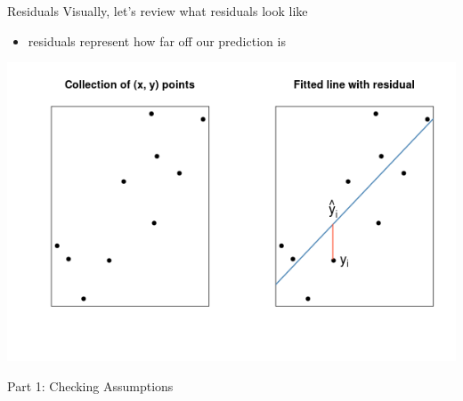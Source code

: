 \documentclass{beamer}
\begin{document}
\begin{frame}{Residuals}
Visually, let's review what residuals look like
\begin{itemize}
    \item residuals represent how far off our prediction is
\end{itemize}
\begin{center}
\includegraphics[scale=0.5]{error.png}
\end{center}
\end{frame}



\begin{frame}
\begin{center}
Part 1: Checking Assumptions
\end{center}
\end{frame}
\end{document}
